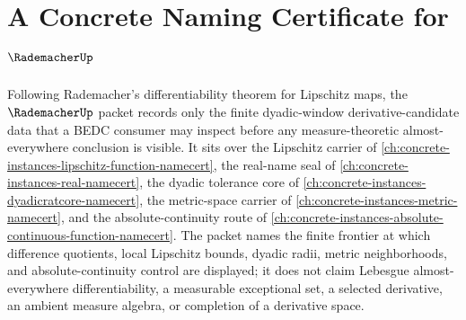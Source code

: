 \chapter{A Concrete Naming Certificate for $\RademacherUp$}
\label{ch:concrete-instances-rademacher-namecert}

Following Rademacher's differentiability theorem for Lipschitz maps, the $\RademacherUp$ packet records only the finite dyadic-window derivative-candidate data that a BEDC consumer may inspect before any measure-theoretic almost-everywhere conclusion is visible. It sits over the Lipschitz carrier of \autoref{ch:concrete-instances-lipschitz-function-namecert}, the real-name seal of \autoref{ch:concrete-instances-real-namecert}, the dyadic tolerance core of \autoref{ch:concrete-instances-dyadicratcore-namecert}, the metric-space carrier of \autoref{ch:concrete-instances-metric-namecert}, and the absolute-continuity route of \autoref{ch:concrete-instances-absolute-continuous-function-namecert}. The packet names the finite frontier at which difference quotients, local Lipschitz bounds, dyadic radii, metric neighborhoods, and absolute-continuity control are displayed; it does not claim Lebesgue almost-everywhere differentiability, a measurable exceptional set, a selected derivative, an ambient measure algebra, or completion of a derivative space.

